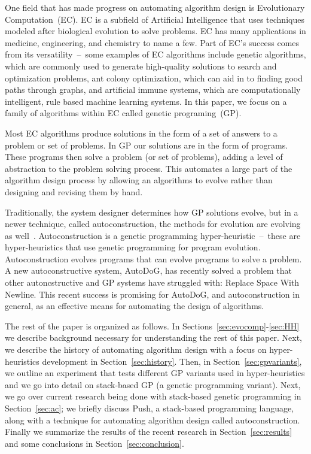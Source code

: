 \documentclass{sig-alternate}
\begin{document}
One field that has made progress on automating algorithm design is Evolutionary Computation~(EC). EC is a subfield of Artificial Intelligence that uses techniques modeled after biological evolution to solve problems. EC has many applications in medicine, engineering, and chemistry to name a few. Part of EC's success comes from its versatility~--~some examples of EC algorithms include genetic algorithms, which are commonly used to generate high-quality solutions to search and optimization problems, ant colony optimization, which can aid in to finding good paths through graphs, and artificial immune systems, which are computationally intelligent, rule based machine learning systems. In this paper, we focus on a family of algorithms within EC called genetic programing~(GP).

Most EC algorithms produce solutions in the form of a set of answers to a problem or set of problems. In GP our solutions are in the form of programs. These programs then solve a problem (or set of problems), adding a level of abstraction to the problem solving process. This automates a large part of the algorithm design process by allowing an algorithms to evolve rather than designing and revising them by hand.

Traditionally, the system designer determines how GP solutions evolve, but in a newer technique, called autoconstruction, the methods for evolution are evolving as well~\cite{spector:2016}. Autoconstruction is a genetic programming hyper-heuristic~--~these are hyper-heuristics that use genetic programming for program evolution. Autoconstruction evolves programs that can evolve programs to solve a problem. A new autoconstructive system, AutoDoG, has recently solved a problem that other autoncstructive and GP systems have struggled with: Replace Space With Newline. This recent success is promising for AutoDoG, and autoconstruction in general, as an effective means for automating the design of algorithms.

The rest of the paper is organized as follows. In Sections~\ref{sec:evocomp}-\ref{sec:HH} we describe background necessary for understanding the rest of this paper. Next, we describe the history of automating algorithm design with a focus on hyper-heuristics development in Section~\ref{sec:history}. Then, in Section~\ref{sec:gpvariants}, we outline an experiment that tests different GP variants used in hyper-heuristics and we go into detail on stack-based GP (a genetic programming variant). Next, we go over current research being done with stack-based genetic programming in Section~\ref{sec:ac}; we briefly discuss Push, a stack-based programming language, along with a technique for automating algorithm design called autoconstruction. Finally we summarize the results of the recent research in Section~\ref{sec:results} and some conclusions in Section~\ref{sec:conclusion}.
\end{document}
